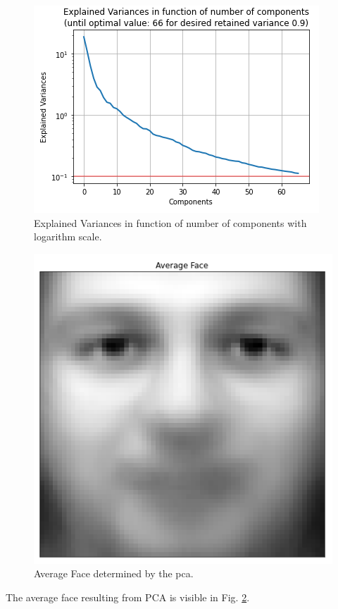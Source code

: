 \documentclass[conference]{IEEEtran}
\begin{document}
\begin{figure}
    \centering
    \includegraphics[scale=1]{images/5_explained_vars_until_k.png}
    \caption{Explained Variances in function of number of components with logarithm scale.}
    \label{fig:variances-log}
\end{figure}

\begin{figure}
    \centering
    \includegraphics[scale=0.75]{images/6_average_face.png}
    \caption{Average Face determined by the \gls{pca}.}
    \label{fig:average_face}
\end{figure}

The average face resulting from PCA is visible in Fig. \ref{fig:average_face}.
\end{document}

